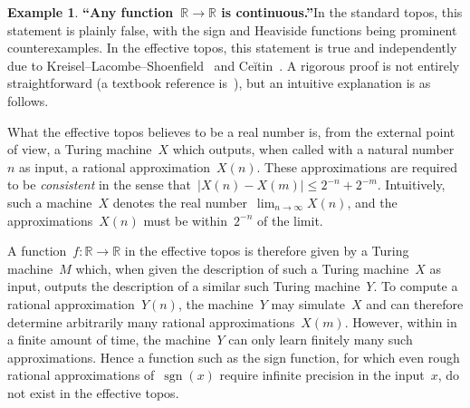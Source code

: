 \documentclass[oneside,reqno]{amsart}
\theoremstyle{definition}
\newtheorem{ex}[defn]{Example}
\theoremstyle{plain}
\theoremstyle{remark}
\newcommand{\RR}{\mathbb{R}}
\renewcommand{\_}{\mathpunct{.}\,}
\newcommand{\effective}{ef{}fective\xspace}
\newcommand{\?}{\,{:}\,}
\begin{document}
\begin{ex}\textbf{``Any function~$\RR \to \RR$ is continuous.''}\label{sect:eff-continuous}
In the standard topos, this statement is plainly false, with the sign and Heaviside functions
being prominent counterexamples. In the \effective topos, this statement is
true and independently due to
Kreisel--Lacombe--Shoenfield~\cite{kreisel-lacombe-shoenfield:cont} and
Ceĭtin~\cite{ceitin:cont}. A rigorous proof is not entirely
straightforward (a textbook reference
is~\cite[Theorem~9.2.1]{longley-normann:higher-order-computability}), but an intuitive
explanation is as follows.

What the \effective topos believes to be a real number is, from the external
point of view, a Turing machine~$X$ which outputs, when called with a natural
number~$n$ as input, a rational approximation~$X(n)$. These approximations are
required to be \emph{consistent} in the sense that~$|X(n) - X(m)|
\leq 2^{-n} + 2^{-m}$. Intuitively, such a machine~$X$ denotes the real
number~$\lim_{n \to \infty} X(n)$, and the approximations~$X(n)$ must be
within~$2^{-n}$ of the limit.

A function~$f : \RR \to \RR$ in the \effective topos is therefore given by a
Turing machine~$M$ which, when given the description of such a Turing machine~$X$ as
input, outputs the description of a similar such Turing machine~$Y$.
To compute a rational approximation~$Y(n)$, the machine~$Y$ may simulate~$X$
and can therefore determine arbitrarily many rational approximations~$X(m)$.
However, within in a finite amount of time, the machine~$Y$ can only learn finitely many
such approximations. Hence a function such as the sign function, for which
even rough rational approximations of~$\operatorname{sgn}(x)$ require infinite
precision in the input~$x$, do not exist in the \effective topos.
\end{ex}
\end{document}
